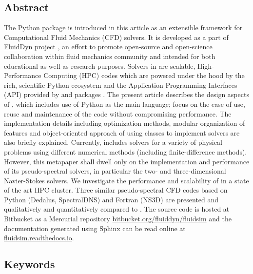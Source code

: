 \subsection{Abstract}


The Python package  is introduced in this article as an extensible
framework for Computational Fluid Mechanics (CFD) solvers.
%
It is developed as a part of \href{https://fluiddyn.readthedocs.io}{FluidDyn}
project \citep{fluiddyn}, an effort to promote open-source and open-science
collaboration within fluid mechanics community and intended for both educational
as well as research purposes.
%
Solvers in  are scalable, High-Performance Computing (HPC) codes
which are powered under the hood by the rich, scientific Python ecosystem and the
Application Programming Interfaces (API) provided by  and
 packages \citep{fluidfft}.
%
The present article describes the design aspects of , which
includes use of Python as the main language; focus on the ease of use, reuse
and maintenance of the code without compromising performance.
%
The implementation details including optimization methods, modular organization
of features and object-oriented approach of using classes to implement solvers
are also briefly explained.
%
Currently,  includes solvers for a variety of physical problems
using different numerical methods (including finite-difference methods).
%
However, this metapaper shall dwell only on the implementation and performance
of its pseudo-spectral solvers, in particular the two- and three-dimensional
Navier-Stokes solvers.
%
We investigate the performance and scalability of  in a
state of the art HPC cluster.
%
Three similar pseudo-spectral CFD codes based on Python (Dedalus, SpectralDNS) and
Fortran (NS3D) are presented and qualitatively and quantitatively compared to
.
%
The source code is hosted at Bitbucket as a Mercurial repository
\href{https://bitbucket.org/fluiddyn/fluidsim}{bitbucket.org/fluiddyn/fluidsim}
and the documentation generated using Sphinx can be read online at
\href{https://fluidsim.readthedocs.io}{fluidsim.readthedocs.io}.

\subsection{Keywords}

